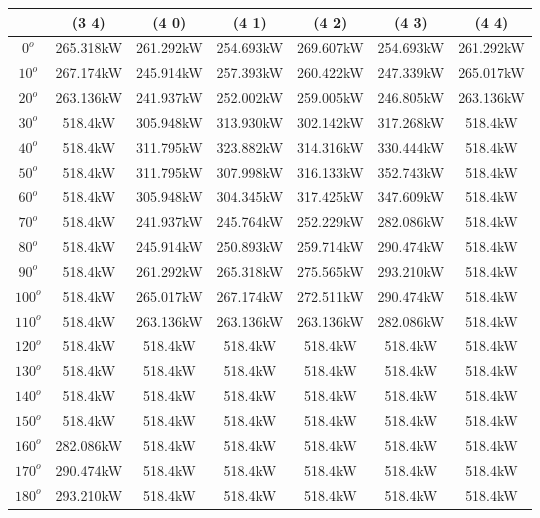         \begin{table}[H]
        	\centering
        	\begin{tabular}{|c|c|c|c|c|c|c|} \hline
        			& (3 4)		& (4 0)		& (4 1)		& (4 2)		& (4 3)		& (4 4)		\\ \hline
		$0^o$	& 265.318kW	& 261.292kW	& 254.693kW	& 269.607kW	& 254.693kW	& 261.292kW	\\ \hline
		$10^o$	& 267.174kW	& 245.914kW	& 257.393kW	& 260.422kW	& 247.339kW	& 265.017kW	\\ \hline
		$20^o$	& 263.136kW	& 241.937kW	& 252.002kW	& 259.005kW	& 246.805kW	& 263.136kW	\\ \hline
		$30^o$	& 518.4kW	& 305.948kW	& 313.930kW	& 302.142kW	& 317.268kW	& 518.4kW	\\ \hline
		$40^o$	& 518.4kW	& 311.795kW	& 323.882kW	& 314.316kW	& 330.444kW	& 518.4kW	\\ \hline
		$50^o$	& 518.4kW	& 311.795kW	& 307.998kW	& 316.133kW	& 352.743kW	& 518.4kW	\\ \hline
		$60^o$	& 518.4kW	& 305.948kW	& 304.345kW	& 317.425kW	& 347.609kW	& 518.4kW	\\ \hline
		$70^o$	& 518.4kW	& 241.937kW	& 245.764kW	& 252.229kW	& 282.086kW	& 518.4kW	\\ \hline
		$80^o$	& 518.4kW	& 245.914kW	& 250.893kW	& 259.714kW	& 290.474kW	& 518.4kW	\\ \hline
		$90^o$	& 518.4kW	& 261.292kW	& 265.318kW	& 275.565kW	& 293.210kW	& 518.4kW	\\ \hline
		$100^o$	& 518.4kW	& 265.017kW	& 267.174kW	& 272.511kW	& 290.474kW	& 518.4kW	\\ \hline
		$110^o$	& 518.4kW	& 263.136kW	& 263.136kW	& 263.136kW	& 282.086kW	& 518.4kW	\\ \hline
		$120^o$	& 518.4kW	& 518.4kW	& 518.4kW	& 518.4kW	& 518.4kW	& 518.4kW	\\ \hline
		$130^o$	& 518.4kW	& 518.4kW	& 518.4kW	& 518.4kW	& 518.4kW	& 518.4kW	\\ \hline
		$140^o$	& 518.4kW	& 518.4kW	& 518.4kW	& 518.4kW	& 518.4kW	& 518.4kW	\\ \hline
		$150^o$	& 518.4kW	& 518.4kW	& 518.4kW	& 518.4kW	& 518.4kW	& 518.4kW	\\ \hline
		$160^o$	& 282.086kW	& 518.4kW	& 518.4kW	& 518.4kW	& 518.4kW	& 518.4kW	\\ \hline
		$170^o$	& 290.474kW	& 518.4kW	& 518.4kW	& 518.4kW	& 518.4kW	& 518.4kW	\\ \hline
		$180^o$	& 293.210kW	& 518.4kW	& 518.4kW	& 518.4kW	& 518.4kW	& 518.4kW	\\ \hline

\end{tabular}
\end{table}
